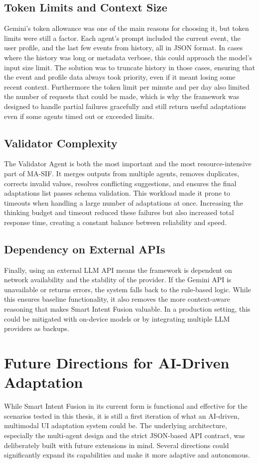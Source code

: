 \documentclass[openany]{book}
\begin{document}
\subsection{Token Limits and Context Size}
Gemini’s token allowance was one of the main reasons for choosing it, but token limits were still a factor. Each agent’s prompt included the current event, the user profile, and the last few events from history, all in JSON format. In cases where the history was long or metadata verbose, this could approach the model’s input size limit. The solution was to truncate history in those cases, ensuring that the event and profile data always took priority, even if it meant losing some recent context. Furthermore the token limit per minute and per day also limited the number of requests that could be made, which is why the framework was designed to handle partial failures gracefully and still return useful adaptations even if some agents timed out or exceeded limits.

\subsection{Validator Complexity}
The Validator Agent is both the most important and the most resource-intensive part of MA-SIF. It merges outputs from multiple agents, removes duplicates, corrects invalid values, resolves conflicting suggestions, and ensures the final adaptations list passes schema validation. This workload made it prone to timeouts when handling a large number of adaptations at once. Increasing the thinking budget and timeout reduced these failures but also increased total response time, creating a constant balance between reliability and speed.

\subsection{Dependency on External APIs}
Finally, using an external LLM API means the framework is dependent on network availability and the stability of the provider. If the Gemini API is unavailable or returns errors, the system falls back to the rule-based logic. While this ensures baseline functionality, it also removes the more context-aware reasoning that makes Smart Intent Fusion valuable. In a production setting, this could be mitigated with on-device models or by integrating multiple LLM providers as backups.

\section{Future Directions for AI-Driven Adaptation}
While Smart Intent Fusion in its current form is functional and effective for the scenarios tested in this thesis, it is still a first iteration of what an AI-driven, multimodal UI adaptation system could be. The underlying architecture, especially the multi-agent design and the strict JSON-based API contract, was deliberately built with future extensions in mind. Several directions could significantly expand its capabilities and make it more adaptive and autonomous.
\end{document}
